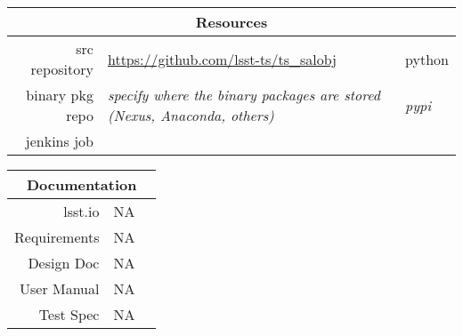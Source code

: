 \begin{longtable}[]{rll}
\hline
\multicolumn{3}{c}{\textbf{Resources}} \\ \hline
src repository & \url{https://github.com/lsst-ts/ts_salobj} & python \\ \hline
binary pkg repo   & \textit{specify where the binary packages are stored (Nexus, Anaconda, others)} & \textit{pypi}\\ \hline
\hline
jenkins job    & & \\ \hline
\end{longtable}

\begin{longtable}[]{rll}
\hline
\multicolumn{3}{c}{\textbf{Documentation}} \\ \hline
lsst.io & NA & \\ \hline
Requirements & NA & \\ \hline
Design Doc & NA & \\ \hline
User Manual & NA & \\ \hline
Test Spec & NA & \\ \hline
\end{longtable}

